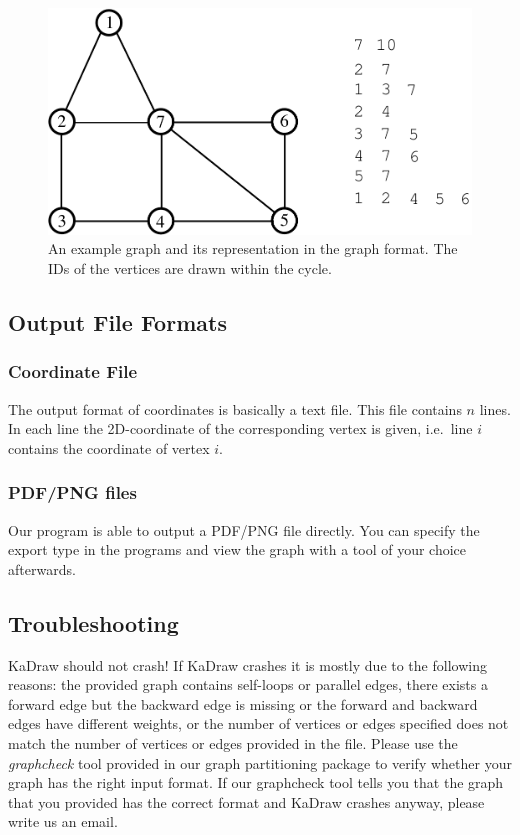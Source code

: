 \documentclass[11pt]{article}
\newcommand{\ie}{i.e.\ }
\begin{document}
\begin{figure}[h!]
\begin{center}
\includegraphics[width=.8\textwidth]{example_graph.pdf}
\end{center}

\caption{An example graph and its representation in the graph format. The IDs of the vertices are drawn within the cycle.}
\label{fig:example}
\end{figure}
\subsection{Output File Formats}
\subsubsection{Coordinate File}
The output format of coordinates is basically a text file. 
This file contains $n$ lines. 
In each line the 2D-coordinate of the corresponding vertex is given, \ie line $i$ contains the coordinate of vertex $i$.
\subsubsection{PDF/PNG files}
Our program is able to output a PDF/PNG file directly. You can specify the export type in the programs and view the graph with a tool of your choice afterwards.
\subsection{Troubleshooting}
KaDraw should not crash! If KaDraw crashes it is mostly due to the following reasons: the provided graph contains self-loops or parallel edges, there exists a forward edge but the backward edge is missing or the forward and backward edges have different weights, or the number of vertices or edges specified does not match the number of vertices or edges provided in the file.
Please use the \emph{graphcheck} tool provided in our graph partitioning package to verify whether your graph has the right input format. If our graphcheck tool tells you that the graph that you provided has the correct format and KaDraw crashes anyway, please write us an email.
\end{document}
